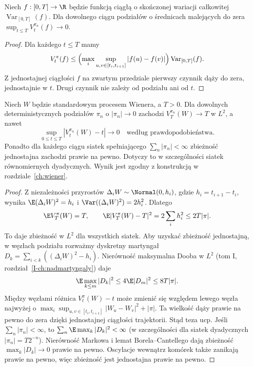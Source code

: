 \begin{lemat}
\label{lem:finite-var-zero-quadratic}
Niech $f:[0,T]\to\R$ będzie funkcją ciągłą o
skończonej wariacji całkowitej $\operatorname{Var}_{[0,T]}(f)$.
Dla dowolnego ciągu podziałów o średnicach malejących
do zera
$\sup_{t\le T}V_t^{\pi_n}(f)\to0$.
\end{lemat}
\begin{proof}
Dla każdego $t\le T$ mamy
\[
V_t^\pi(f)\le
\Bigl(\max_i\sup_{u,v\in[t_i,t_{i+1}]}|f(u)-f(v)|\Bigr)
\operatorname{Var}_{[0,T]}(f).
\]
Z jednostajnej ciągłości $f$ na zwartym przedziale
pierwszy czynnik dąży do zera, jednostajnie w $t$.
Drugi czynnik nie zależy od podziału ani od $t$.
\end{proof}

\begin{twierdzenie}
\label{thm:brownian-bracket}
Niech $W$ będzie standardowym procesem Wienera,
a $T>0$. Dla dowolnych deterministycznych podziałów
$\pi_n$ o $|\pi_n|\to0$ zachodzi
$V_T^{\pi_n}(W)\to T$ w $L^2$, a nawet
\[
\sup_{0\le t\le T}|V_t^{\pi_n}(W)-t|
\longrightarrow0
\quad\text{według prawdopodobieństwa}.
\]
Ponadto dla każdego ciągu siatek spełniającego
$\sum_n|\pi_n|<\infty$ zbieżność jednostajna
zachodzi prawie na pewno. Dotyczy to w szczególności
siatek równomiernych dyadycznych.
Wynik jest zgodny z konstrukcją w rozdziale~\ref{ch:wiener}.
\end{twierdzenie}
\begin{proof}
Z niezależności przyrostów $\Delta_iW\sim
\Normal(0,h_i)$, gdzie $h_i=t_{i+1}-t_i$,
wynika $\E(\Delta_iW)^2=h_i$ i
$\Var((\Delta_iW)^2)=2h_i^2$.
Dlatego
\[
\E V_T^\pi(W)=T,\qquad
\E|V_T^\pi(W)-T|^2=2\sum_i h_i^2
\le2T|\pi|.
\]
To daje zbieżność w $L^2$ dla wszystkich siatek.
Aby uzyskać zbieżność jednostajną, w węzłach podziału
rozważmy dyskretny martyngał
$D_k=\sum_{i<k}((\Delta_iW)^2-h_i)$.
Nierówność maksymalna Dooba w $L^2$
(tom I, rozdział~\ref{I-ch:nadmartyngaly}) daje
\[
\E\max_{k\le m}|D_k|^2\le4\E|D_m|^2
\le8T|\pi|.
\]
Między węzłami różnica $V_t^\pi(W)-t$ może
zmienić się względem lewego węzła najwyżej o
$\max_i\sup_{u,v\in[t_i,t_{i+1}]}|W_u-W_v|^2+|\pi|$.
Ta wielkość dąży prawie na pewno do zera dzięki
jednostajnej ciągłości trajektorii. Stąd teza ucp.
Jeśli $\sum_n|\pi_n|<\infty$, to
$\sum_n\E\max_k|D_k|^2<\infty$
(w szczególności dla siatek dyadycznych $|\pi_n|=T2^{-n}$).
Nierówność Markowa i lemat Borela--Cantellego dają
zbieżność $\max_k|D_k|\to0$ prawie na pewno.
Oscylacje wewnątrz komórek także zanikają prawie na pewno,
więc zbieżność jest jednostajna prawie na pewno.
\end{proof}

